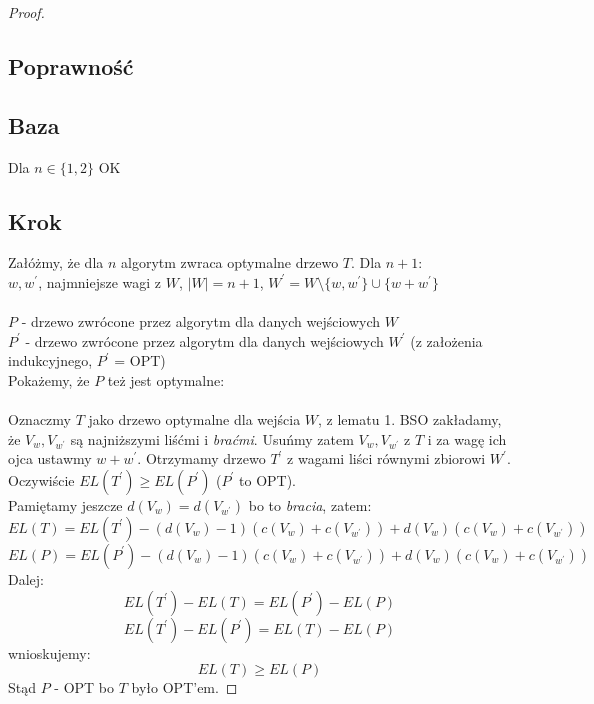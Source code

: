 \documentclass{article}
\begin{document}
\begin{proof}
\clearpage
\subsection*{Poprawność}
\subsection*{Baza}
Dla $n \in \{1,2\}$ OK
\subsection*{Krok}
Załóżmy, że dla $n$ algorytm zwraca optymalne drzewo $T$. Dla $n+1$:\\
$w,w^\prime$, najmniejsze wagi z $W$, $|W| = n+1$, $W^\prime = W \setminus\{w,w^\prime\} \cup \{w+w^\prime\}$\\\\
$P$ - drzewo zwrócone przez algorytm dla danych wejściowych $W$\\
$P^\prime$ - drzewo zwrócone przez algorytm dla danych wejściowych $W^\prime$ (z założenia indukcyjnego, $P^\prime$ = OPT)\\
Pokażemy, że $P$ też jest optymalne:\\\\
Oznaczmy $T$ jako drzewo optymalne dla wejścia $W$, z lematu 1. BSO zakładamy, że $V_w,V_{w^\prime}$ są najniższymi liśćmi i \textit{braćmi}. Usuńmy zatem $V_w,V_{w^\prime}$ z $T$ i za wagę ich ojca ustawmy $w+w^\prime$. Otrzymamy drzewo $T^\prime$ z wagami liści równymi zbiorowi $W^\prime$. Oczywiście $EL(T^\prime) \geq EL(P^\prime)$ ($P^\prime$ to OPT).\\
Pamiętamy jeszcze $d(V_w) = d(V_{w^\prime})$ bo to \textit{bracia}, zatem:
$$
EL(T) = EL(T^\prime) - (d(V_w)-1)(c(V_w) + c(V_{w^\prime})) + d(V_w)(c(V_w) + c(V_{w^\prime}))
$$
$$
EL(P) = EL(P^\prime) - (d(V_w)-1)(c(V_w) + c(V_{w^\prime})) + d(V_w)(c(V_w) + c(V_{w^\prime}))
$$
Dalej:
$$
EL(T^\prime) - EL(T) = EL(P^\prime) - EL(P)
$$
$$
EL(T^\prime) -EL(P^\prime) = EL(T) - EL(P)
$$
wnioskujemy:
$$
EL(T) \geq EL(P)
$$
Stąd $P$ - OPT bo $T$ było OPT'em.
\end{proof}
\end{document}
